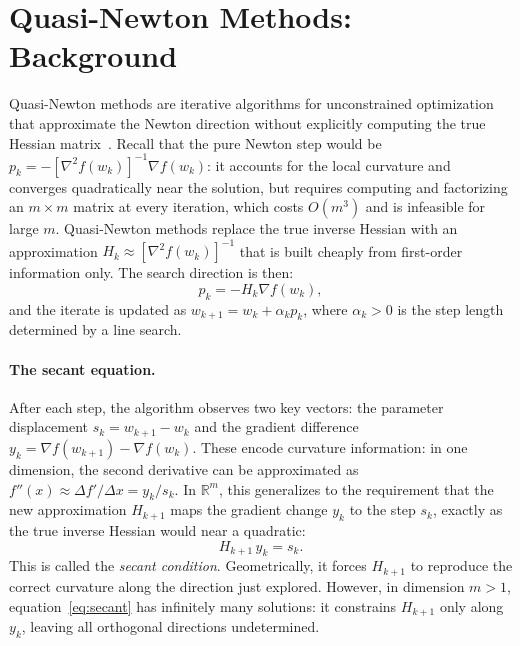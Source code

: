 \label{sec:lbfgs}


\section{Quasi-Newton Methods: Background}

\noindent Quasi-Newton methods are iterative algorithms for unconstrained
optimization that approximate the Newton direction without explicitly computing
the true Hessian matrix~\cite{nocedal2006numerical}. Recall that the pure Newton
step would be $p_k = -[\nabla^2 f(w_k)]^{-1} \nabla f(w_k)$: it accounts for
the local curvature and converges quadratically near the solution, but requires
computing and factorizing an $m \times m$ matrix at every iteration, which costs
$O(m^3)$ and is infeasible for large $m$. Quasi-Newton methods replace the true
inverse Hessian with an approximation $H_k \approx [\nabla^2 f(w_k)]^{-1}$ that
is built cheaply from first-order information only. The search direction is then:
\begin{equation}
\label{eq:qn_direction}
    p_k = -H_k \nabla f(w_k),
\end{equation}
and the iterate is updated as $w_{k+1} = w_k + \alpha_k p_k$, where $\alpha_k > 0$
is the step length determined by a line search.

\paragraph{The secant equation.}
After each step, the algorithm observes two key vectors: the parameter displacement
$s_k = w_{k+1} - w_k$ and the gradient difference
$y_k = \nabla f(w_{k+1}) - \nabla f(w_k)$. These encode curvature information:
in one dimension, the second derivative can be approximated as
$f''(x) \approx \Delta f' / \Delta x = y_k / s_k$. In $\mathbb{R}^m$, this
generalizes to the requirement that the new approximation $H_{k+1}$ maps the
gradient change $y_k$ to the step $s_k$, exactly as the true inverse Hessian
would near a quadratic:
\begin{equation}
\label{eq:secant}
    H_{k+1}\, y_k = s_k.
\end{equation}
This is called the \emph{secant condition}. Geometrically, it forces $H_{k+1}$
to reproduce the correct curvature along the direction just explored. However,
in dimension $m > 1$, equation~\eqref{eq:secant} has infinitely many solutions:
it constrains $H_{k+1}$ only along $y_k$, leaving all orthogonal directions
undetermined.


